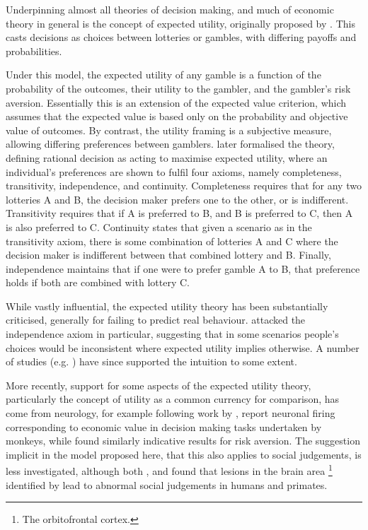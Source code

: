 Underpinning almost all theories of decision making, and much of economic
theory in general is the concept of expected utility, originally proposed
by \citet{Bernoulli1954}. This casts decisions as choices between
lotteries or gambles, with differing payoffs and probabilities.

Under this model, the expected utility of any gamble is a function
of the probability of the outcomes, their utility to the gambler,
and the gambler's risk aversion. Essentially this is an extension
of the expected value criterion, which assumes that the expected value
is based only on the probability and objective value of outcomes.
By contrast, the utility framing is a subjective measure, allowing
differing preferences between gamblers. \citet{Neumann1953} later
formalised the theory, defining rational decision as acting to maximise
expected utility, where an individual's preferences are shown to fulfil
four axioms, namely completeness, transitivity, independence, and
continuity. Completeness requires that for any two lotteries A and
B, the decision maker prefers one to the other, or is indifferent.
Transitivity requires that if A is preferred to B, and B is preferred
to C, then A is also preferred to C. Continuity states that given
a scenario as in the transitivity axiom, there is some combination
of lotteries A and C where the decision maker is indifferent between
that combined lottery and B. Finally, independence maintains that
if one were to prefer gamble A to B, that preference holds if both
are combined with lottery C.

While vastly influential, the expected utility theory has been substantially
criticised, generally for failing to predict real behaviour. \citet{Society2013}
attacked the independence axiom in particular, suggesting that in
some scenarios people's choices would be inconsistent where expected
utility implies otherwise. A number of studies (e.g. \citep{Oliver2003,Burke1996})
have since supported the intuition to some extent.

More recently, support for some aspects of the expected utility theory,
particularly the concept of utility as a common currency for comparison,
has come from neurology, for example following work by \citet{Platt1999},
\citet{Padoa-Schioppa2006,Padoa-Schioppa2008} report neuronal firing
corresponding to economic value in decision making tasks undertaken
by monkeys, while \citet{Christopoulos2009} found similarly indicative
results for risk aversion. The suggestion implicit in the model proposed
here, that this also applies to social judgements, is less investigated,
although both \citet{Watson2012}, and \citet{Willis2010} found that
lesions in the brain area%
\footnote{The orbitofrontal cortex.%
} identified by \citeauthor{Padoa-Schioppa2006} lead to abnormal social
judgements in humans and primates.

